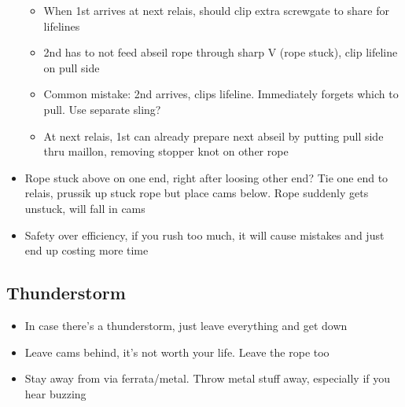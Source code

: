 \begin{itemize}
\begin{itemize}
	\item When 1st arrives at next relais, should clip extra screwgate to share for lifelines
	\item 2nd has to not feed abseil rope through sharp V (rope stuck), clip lifeline on pull side
	\item Common mistake: 2nd arrives, clips lifeline. Immediately forgets which to pull. Use separate sling?
	\item At next relais, 1st can already prepare next abseil by putting pull side thru maillon, removing stopper knot on other rope
	\end{itemize}
\item Rope stuck above on one end, right after loosing other end? Tie one end to relais, prussik up stuck rope but place cams below. Rope suddenly gets unstuck, will fall in cams
\item Safety over efficiency, if you rush too much, it will cause mistakes and just end up costing more time
\end{itemize}

\subsection{Thunderstorm}
\begin{itemize}
\item In case there's a thunderstorm, just leave everything and get down
\item Leave cams behind, it's not worth your life. Leave the rope too
\item Stay away from via ferrata/metal. Throw metal stuff away, especially if you hear buzzing

\end{itemize}
